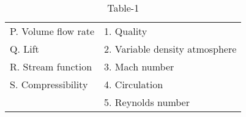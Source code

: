 \begin{table}[htbp]
\centering
\caption{Table-1}
\label{Table1}
\begin{tabular}{ll}
P. Volume flow rate & 1. Quality \\
Q. Lift & 2. Variable density atmosphere\\
R. Stream function & 3. Mach number \\
S. Compressibility & 4. Circulation\\
 & 5. Reynolds number 


\end{tabular}

\end{table}  